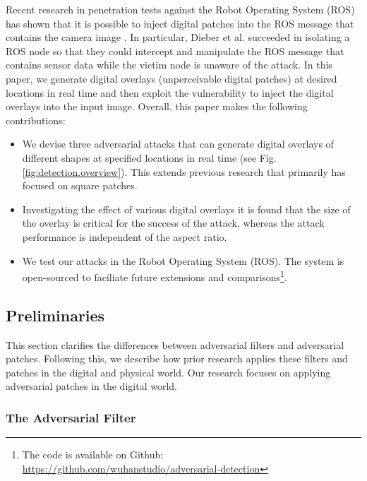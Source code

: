 Recent research in penetration tests against the Robot Operating System (ROS) has shown that it is possible to inject digital patches into the ROS message that contains the camera image \citep{dieber2020penetration}. In particular, Dieber et al. succeeded in isolating a ROS node so that they could intercept and manipulate the ROS message that contains sensor data while the victim node is unaware of the attack. In this paper, we generate digital overlays (unperceivable digital patches) at desired locations in real time and then exploit the vulnerability to inject the digital overlays into the input image. Overall, this paper makes the following contributions:
\begin{itemize}
    \item We devise three adversarial attacks that can generate digital overlays of different shapes at specified locations in real time (see Fig. \ref{fig:detection.overview}). This extends previous research that primarily has focused on square patches.
    \item 
    Investigating the effect of various digital overlays it is found that the size of the overlay is critical for the 
    success of the attack, whereas the attack performance is independent of the aspect ratio.
    
    \item We test our attacks in the Robot Operating System (ROS). The system is open-sourced to faciliate future extensions and comparisons\footnote{The code is available on Github: \url{https://github.com/wuhanstudio/adversarial-detection}}.
\end{itemize}

\subsection{Preliminaries}
\label{section_preliminaries}

This section clarifies the differences between adversarial filters and adversarial patches. Following this, we describe how prior research applies these filters and patches in the digital and physical world. Our research focuses on applying adversarial patches in the digital world.

\subsubsection{The Adversarial Filter}

